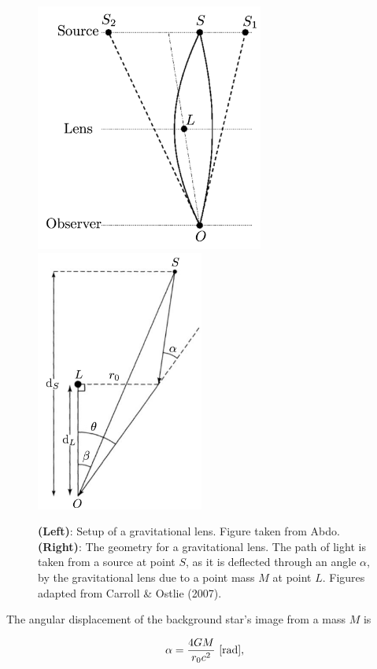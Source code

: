 \documentclass[a4paper,10pt]{article}
\begin{document}
\begin{figure}[h]
    \centering
    \includegraphics[width=7.5cm]{figures/GravitationalLens.png}
    \includegraphics[width=5.5cm]{figures/GravitationalLensAngles.png}
    \caption{\footnotesize{\textbf{(Left)}: Setup of a gravitational lens. Figure taken from Abdo. \textbf{(Right)}: The geometry for a gravitational lens. The path of light is taken from a source at point $S$, as it is deflected through an angle $\alpha$, by the gravitational lens due to a point mass $M$ at point $L$. Figures adapted from Carroll \& Ostlie (2007).}}
    \label{fig:gravitationallens}
\end{figure}

{\noindent}The angular displacement of the background star's image from a mass $M$ is

\begin{align*}
    \alpha = \frac{4GM}{r_0c^2} ~ [{\rm rad}],
\end{align*}
\end{document}
